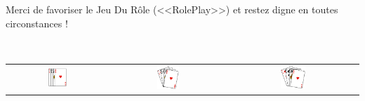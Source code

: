 \documentclass[a5paper,pagesize,french]{book}
\begin{document}
\begin{center}
	{ \setmainfont{Z003} Merci de favoriser le Jeu Du Rôle (<<RolePlay>>) et restez digne en toutes circonstances ! }
\end{center}~\\


\begin{center}
	\begin{tabular}[c]{ c c c }

		\includegraphics[width=0.20\textwidth]{img/MainCarteExample1.png} &	
		\includegraphics[width=0.20\textwidth]{img/MainCarteExample2.png} &	
		\includegraphics[width=0.20\textwidth]{img/MainCarteExample3.png} \\

	\end{tabular}
\end{center}




\clearpage

\end{document}
